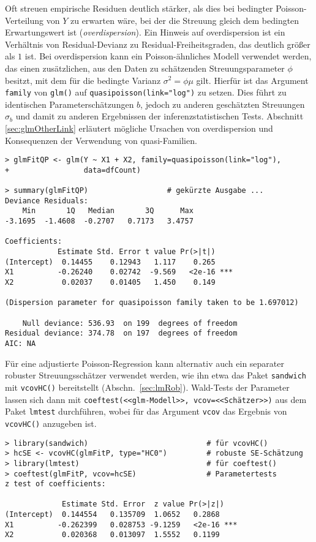 Oft streuen empirische Residuen deutlich stärker, als dies bei bedingter Poisson-Verteilung von $Y$ zu erwarten wäre, bei der die Streuung gleich dem bedingten Erwartungswert ist (\emph{overdispersion}). Ein Hinweis auf overdispersion ist ein Verhältnis von Residual-Devianz zu Residual-Freiheitsgraden, das deutlich größer als $1$ ist. Bei overdispersion kann ein Poisson-ähnliches Modell verwendet werden, das einen zusätzlichen, aus den Daten zu schätzenden Streuungsparameter $\phi$ besitzt, mit dem für die bedingte Varianz $\sigma^{2} = \phi \mu$ gilt. Hierfür ist das Argument \lstinline!family! von \lstinline!glm()! auf \lstinline!quasipoisson(link="log")! zu setzen. Dies führt zu identischen Parameterschätzungen $b$, jedoch zu anderen geschätzten Streuungen $\hat{\sigma}_{b}$ und damit zu anderen Ergebnissen der inferenzstatistischen Tests. Abschnitt \ref{sec:glmOtherLink} erläutert mögliche Ursachen von overdispersion und Konsequenzen der Verwendung von quasi-Familien.
\begin{lstlisting}
> glmFitQP <- glm(Y ~ X1 + X2, family=quasipoisson(link="log"),
+                 data=dfCount)

> summary(glmFitQP)                  # gekürzte Ausgabe ...
Deviance Residuals:
    Min       1Q   Median       3Q      Max
-3.1695  -1.4608  -0.2707   0.7173   3.4757

Coefficients:
            Estimate Std. Error t value Pr(>|t|)
(Intercept)  0.14455    0.12943   1.117    0.265
X1          -0.26240    0.02742  -9.569   <2e-16 ***
X2           0.02037    0.01405   1.450    0.149

(Dispersion parameter for quasipoisson family taken to be 1.697012)

    Null deviance: 536.93  on 199  degrees of freedom
Residual deviance: 374.78  on 197  degrees of freedom
AIC: NA
\end{lstlisting}

Für eine adjustierte Poisson-Regression kann alternativ auch ein separater robuster Streuungsschätzer verwendet werden, wie ihn etwa das Paket \lstinline!sandwich! mit \lstinline!vcovHC()! bereitstellt (Abschn.\ \ref{sec:lmRob}). Wald-Tests der Parameter lassen sich dann mit \lstinline!coeftest(<<glm-Modell>>, vcov=<<Schätzer>>)! aus dem Paket  \lstinline!lmtest! durchführen, wobei für das Argument \lstinline!vcov! das Ergebnis von \lstinline!vcovHC()! anzugeben ist.
\begin{lstlisting}
> library(sandwich)                           # für vcovHC()
> hcSE <- vcovHC(glmFitP, type="HC0")         # robuste SE-Schätzung
> library(lmtest)                             # für coeftest()
> coeftest(glmFitP, vcov=hcSE)                # Parametertests
z test of coefficients:

             Estimate Std. Error  z value Pr(>|z|)
(Intercept)  0.144554   0.135709  1.0652   0.2868
X1          -0.262399   0.028753 -9.1259   <2e-16 ***
X2           0.020368   0.013097  1.5552   0.1199
\end{lstlisting}

